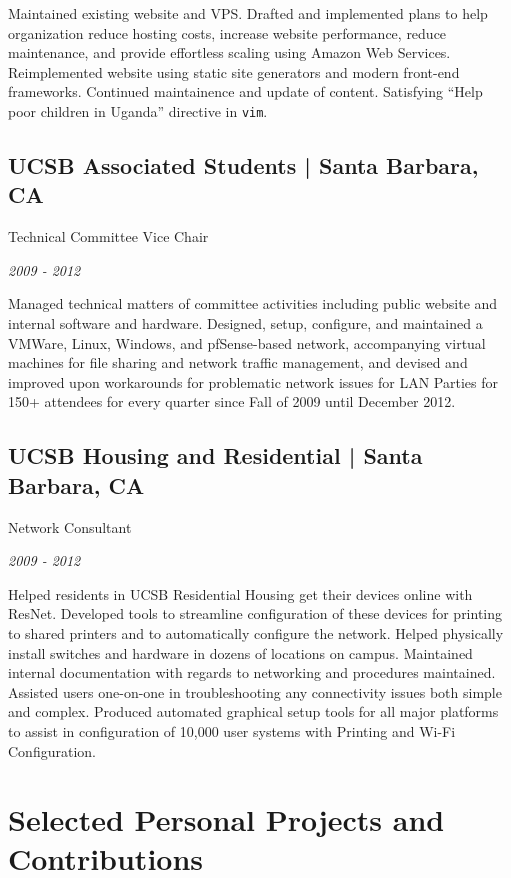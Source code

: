 \documentclass[10pt, letter]{article}
\newcommand{\years}[1]{\marginnote{#1}}
\renewcommand{\years}[1]{{\emph{#1}}}
\begin{document}
\begin{multicols}{2}
Maintained existing website and VPS. Drafted and implemented plans to help
organization reduce hosting costs, increase website performance, reduce
maintenance, and provide effortless scaling using Amazon Web Services.
Reimplemented website using static site generators and modern front-end
frameworks. Continued maintainence and update of content. Satisfying ``Help
poor children in Uganda'' directive in \texttt{vim}.

\subsection*{UCSB Associated Students | {\footnotesize{Santa Barbara, CA}}}

Technical Committee Vice Chair

\years{2009 - 2012}

Managed technical matters of committee activities including public website and
internal software and hardware. Designed, setup, configure, and maintained
a VMWare, Linux, Windows, and pfSense-based network, accompanying virtual
machines for file sharing and network traffic management, and devised and
improved upon workarounds for problematic network issues for LAN Parties for
150+ attendees for every quarter since Fall of 2009 until December 2012.

\subsection*{UCSB Housing and Residential | {\footnotesize{Santa Barbara, CA}}}

Network Consultant

\years{2009 - 2012}

Helped residents in UCSB Residential Housing get their devices online with
ResNet.  Developed tools to streamline configuration of these devices for
printing to shared printers and to automatically configure the network. Helped
physically install switches and hardware in dozens of locations on campus.
Maintained internal documentation with regards to networking and procedures
maintained. Assisted users one-on-one in troubleshooting any connectivity
issues both simple and complex. Produced automated graphical setup tools for
all major platforms to assist in configuration of 10,000 user systems with
Printing and Wi-Fi Configuration.

\section*{Selected Personal Projects and Contributions}


\end{multicols}
\end{document}
